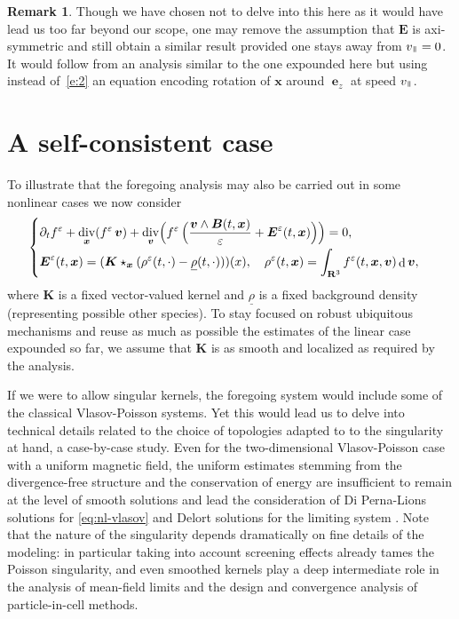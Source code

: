 \documentclass[JEP,XML,SOM,Unicode]{cedram}
\newenvironment{splitcases}
{\begin{cases}\begin{aligned}}
{\end{aligned}\end{cases}}
\let\eps\varepsilon
\let\d\partial
\DeclareMathOperator\dD{d}\let\dd\dD
\DeclareMathOperator{\Div}{div}
\theoremstyle{plain}
\theoremstyle{definition}
\newtheorem{remark}[theorem]{Remark}
\newcommand\br{\begin{remark}}
\newcommand\er{\end{remark}}
\newcommand{\be}{\begin{equation}}
\newcommand{\ee}{\end{equation}}
\newcommand\R{\mathbf R}
\newcommand\bB{{\boldsymbol B}}
\newcommand\bE{{\boldsymbol E}}
\newcommand\bK{{\boldsymbol K}}
\newcommand\bfv{{\boldsymbol v}}
\newcommand\bfx{{\boldsymbol x}}
\newcommand\urho{{\underline \rho}}
\DeclareMathOperator{\beD}{\boldsymbol{e}}
\newcommand\eDz{\beD_z}
\newcommand\vpar{v_\mypar}
\newcommand{\mypar}{{\mkern3mu\vphantom{\perp}\vrule depth 0pt\mkern2mu\vrule depth 0pt\mkern3mu}}
\begin{document}
\br\label{rk:axi}
Though we have chosen not to delve into this here as it would have lead us too far beyond our scope, one may remove the assumption that $\bE$ is axi-symmetric and still obtain a similar result provided one stays away from $\vpar=0$. It would follow from an analysis similar to the one expounded here but using instead of~\eqref{e:2} an equation encoding rotation of $\bfx$ around $\eDz$ at speed $\vpar$.
\er

\section{A self-consistent case}\label{s:nl}

To illustrate that the foregoing analysis may also be carried out in some nonlinear cases we now consider
\be\label{eq:nl-vlasov}
\begin{splitcases}
&\d_t f^\eps+\Div_\bfx(f^\eps\,\bfv)
+\Div_\bfv\Bigl(f^\eps\,\Bigl(\frac{\bfv\wedge \bB(t,\bfx)}{\eps}+\bE^\eps(t,\bfx)\Bigr)\Bigr)=0,\\
&\bE^\eps(t,\bfx)=(\bK\star_{\bfx}(\rho^\eps(t,\cdot)-\urho(t,\cdot)))(x),\quad
\rho^\eps(t,\bfx)=\int_{\R^3}f^\eps(t,\bfx,\bfv)\dD \bfv,
\end{splitcases}
\ee
where $\bK$ is a fixed vector-valued kernel and $\urho$ is a fixed background density (representing possible other species). To stay focused on robust ubiquitous mechanisms and reuse as much as possible the estimates of the linear case expounded so far, we assume that $\bK$ is as smooth and localized as required by the analysis.

If we were to allow singular kernels, the foregoing system would include some of the classical Vlasov-Poisson systems. Yet this would lead us to delve into technical details related to the choice of topologies adapted to to the singularity at hand, a case-by-case study. Even for the two-dimensional Vlasov-Poisson case with a uniform magnetic field, the uniform estimates stemming from the divergence-free structure and the conservation of energy are insufficient to remain at the level of smooth solutions and lead the consideration of Di Perna-Lions solutions for \eqref{eq:nl-vlasov} and Delort solutions for the limiting system \cite{Miot-2D-gyrokinetic}. Note that the nature of the singularity depends dramatically on fine details of the modeling: in particular taking into account screening effects already tames the Poisson singularity, and even smoothed kernels play a deep intermediate role in the analysis of mean-field limits and the design and convergence analysis of particle-in-cell methods.
\end{document}
